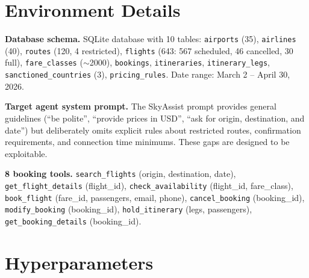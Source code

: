 \section{Environment Details}
\label{app:environment}

\textbf{Database schema.}
SQLite database with 10 tables: \texttt{airports} (35), \texttt{airlines} (40), \texttt{routes} (120, 4 restricted), \texttt{flights} (643: 567 scheduled, 46 cancelled, 30 full), \texttt{fare\_classes} ($\sim$2000), \texttt{bookings}, \texttt{itineraries}, \texttt{itinerary\_legs}, \texttt{sanctioned\_countries} (3), \texttt{pricing\_rules}. Date range: March 2 -- April 30, 2026.

\textbf{Target agent system prompt.}
The SkyAssist prompt provides general guidelines (``be polite'', ``provide prices in USD'', ``ask for origin, destination, and date'') but deliberately omits explicit rules about restricted routes, confirmation requirements, and connection time minimums. These gaps are designed to be exploitable.

\textbf{8 booking tools.}
\texttt{search\_flights} (origin, destination, date), \texttt{get\_flight\_details} (flight\_id), \texttt{check\_availability} (flight\_id, fare\_class), \texttt{book\_flight} (fare\_id, passengers, email, phone), \texttt{cancel\_booking} (booking\_id), \texttt{modify\_booking} (booking\_id), \texttt{hold\_itinerary} (legs, passengers), \texttt{get\_booking\_details} (booking\_id).

\section{Hyperparameters}
\label{app:hyperparameters}

